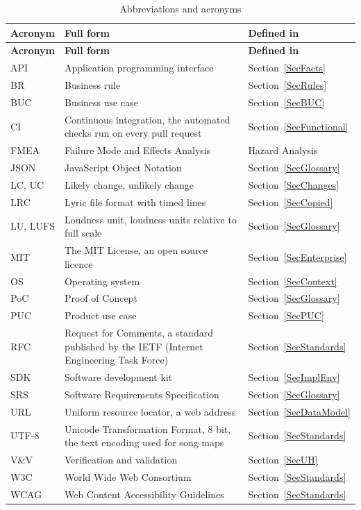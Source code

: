 \documentclass[12pt]{article}
\begin{document}
{\small
\begin{longtable}{@{}P{0.16\textwidth}P{0.5\textwidth}P{0.28\textwidth}@{}}
\caption{Abbreviations and acronyms} \label{TblAcronyms}\\
\toprule
\textbf{Acronym} & \textbf{Full form} & \textbf{Defined in}\\
\midrule
\endfirsthead
\toprule
\textbf{Acronym} & \textbf{Full form} & \textbf{Defined in}\\
\midrule
\endhead
API & Application programming interface & Section~\ref{SecFacts}\\
BR & Business rule & Section~\ref{SecRules}\\
BUC & Business use case & Section~\ref{SecBUC}\\
CI & Continuous integration, the automated checks run on every pull request
& Section~\ref{SecFunctional}\\
FMEA & Failure Mode and Effects Analysis & Hazard Analysis\\
JSON & JavaScript Object Notation & Section~\ref{SecGlossary}\\
LC, UC & Likely change, unlikely change & Section~\ref{SecChanges}\\
LRC & Lyric file format with timed lines & Section~\ref{SecCopied}\\
LU, LUFS & Loudness unit, loudness units relative to full scale &
Section~\ref{SecGlossary}\\
MIT & The MIT License, an open source licence & Section~\ref{SecEnterprise}\\
OS & Operating system & Section~\ref{SecContext}\\
PoC & Proof of Concept & Section~\ref{SecGlossary}\\
PUC & Product use case & Section~\ref{SecPUC}\\
RFC & Request for Comments, a standard published by the IETF (Internet
Engineering Task Force) & Section~\ref{SecStandards}\\
SDK & Software development kit & Section~\ref{SecImplEnv}\\
SRS & Software Requirements Specification & Section~\ref{SecGlossary}\\
URL & Uniform resource locator, a web address & Section~\ref{SecDataModel}\\
UTF-8 & Unicode Transformation Format, 8 bit, the text encoding used for
song maps & Section~\ref{SecStandards}\\
V\&V & Verification and validation & Section~\ref{SecUH}\\
W3C & World Wide Web Consortium & Section~\ref{SecStandards}\\
WCAG & Web Content Accessibility Guidelines & Section~\ref{SecStandards}\\
\bottomrule
\end{longtable}
}
\end{document}
